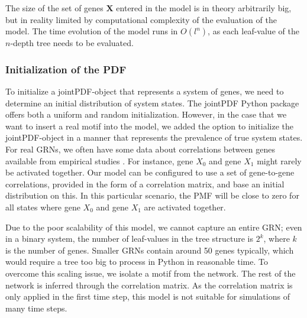 \documentclass[../main.tex]{subfiles}
\begin{document}
The size of the set of genes $\mathbf{X}$ entered in the model is in theory arbitrarily big, but in reality limited by computational complexity of the evaluation of the model.
The time evolution of the model runs in $O(l^{n})$, as each leaf-value of the $n$-depth tree needs to be evaluated.

\subsubsection{Initialization of the PDF}

To initialize a jointPDF-object that represents a system of genes, we need to determine an initial distribution of system states.
The jointPDF Python package offers both a uniform and random initialization.
However, in the case that we want to insert a real motif into the model, we added the option to initialize the jointPDF-object in a manner that represents the prevalence of true system states.
For real GRNs, we often have some data about correlations between genes available from empirical studies \cite{ideker2001integrated}.
For instance, gene $X_0$ and gene $X_1$ might rarely be activated together.
Our model can be configured to use a set of gene-to-gene correlations, provided in the form of a correlation matrix, and base an initial distribution on this.
In this particular scenario, the PMF will be close to zero for all states where gene $X_0$ and gene $X_1$ are activated together.

Due to the poor scalability of this model, we cannot capture an entire GRN; even in a binary system, the number of leaf-values in the tree structure is $2^k$, where $k$ is the number of genes.
Smaller GRNs contain around 50 genes typically, which would require a tree too big to process in Python in reasonable time.
To overcome this scaling issue, we isolate a motif from the network.
The rest of the network is inferred through the correlation matrix.
As the correlation matrix is only applied in the first time step, this model is not suitable for simulations of many time steps.
\end{document}
